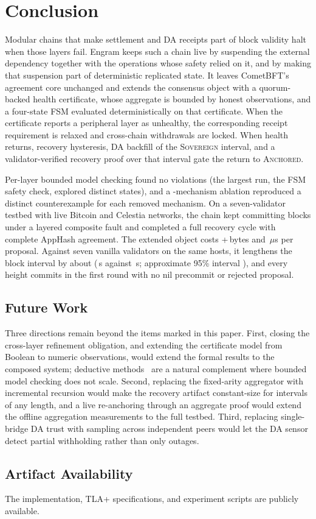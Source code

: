 \section{Conclusion}
\label{sec:conclusion}

Modular chains that make settlement and DA receipts part of block validity
halt when those layers fail. Engram keeps such a chain live by suspending the
external dependency together with the operations whose safety relied on it, and
by making that suspension part of deterministic replicated state. It leaves
CometBFT's agreement core unchanged and extends the consensus object with a
quorum-backed health certificate, whose aggregate is bounded by honest
observations, and a four-state FSM evaluated deterministically on that
certificate. When the certificate reports a peripheral layer as unhealthy, the
corresponding receipt requirement is relaxed and cross-chain withdrawals are
locked. When health returns, recovery hysteresis, DA backfill of the
\textsc{Sovereign} interval, and a validator-verified recovery proof over that
interval gate the return to \textsc{Anchored}.

Per-layer bounded model checking found no violations (the largest run, the
FSM safety check, explored \resFSMStatesM{} distinct states), and a \resAblationCount-mechanism ablation reproduced a distinct
counterexample for each removed mechanism. On a seven-validator testbed with
live Bitcoin and Celestia networks, the chain kept committing blocks under a
layered composite fault and completed a full recovery cycle with complete
AppHash agreement. The extended object costs +\resProposalBytes\,bytes and \resValidationUs\,$\mu$s per
proposal. Against seven vanilla validators on the same hosts, it
lengthens the block interval by about \resOverheadPct{} (\resBlockEngram\,s against \resBlockVanilla\,s; approximate 95\% interval \resOverheadCI{}), and every
height commits in the first round with no nil precommit or rejected proposal.

\subsection*{Future Work}

Three directions remain beyond the items marked in this paper. First,
closing the cross-layer refinement obligation, and extending the
certificate model from Boolean to numeric observations, would extend the
formal results to the composed system; deductive methods~\cite{padon2016ivy,lotan2025implicit}
are a natural complement where bounded model checking does not scale.
Second, replacing the fixed-arity aggregator with incremental recursion
would make the recovery artifact constant-size for intervals of any length,
and a live re-anchoring through an aggregate proof would extend the offline
aggregation measurements to the full testbed. Third,
replacing single-bridge DA trust with sampling across independent peers
would let the DA sensor detect partial withholding rather than only outages.

\subsection*{Artifact Availability}

The implementation, TLA+ specifications, and experiment scripts are
publicly available.
